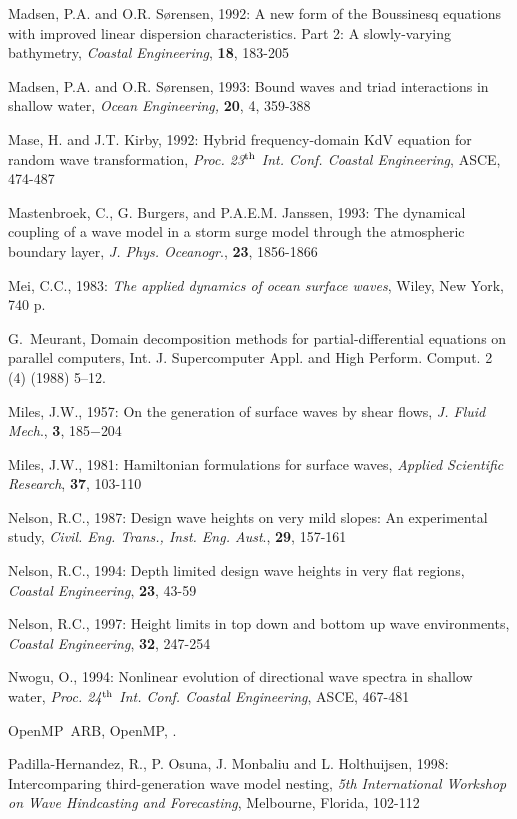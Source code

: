\documentclass[12pt]{book}
\newcommand{\hl}[1]{\htmladdnormallink{{\it #1}}{#1}}
\begin{document}
\begin{thebibliography}{10}
Madsen, P.A. and O.R. S{\o}rensen, 1992: A new form of the Boussinesq equations with improved linear
dispersion characteristics. Part 2: A slowly-varying bathymetry, {\it Coastal Engineering}, {\bf 18}, 183-205

Madsen, P.A. and O.R. S{\o}rensen, 1993: Bound waves and triad interactions in shallow water, {\it Ocean
Engineering,} {\bf 20}, 4, 359-388

Mase, H. and J.T. Kirby, 1992: Hybrid frequency-domain KdV equation for random wave transformation,
{\it Proc. 23$^{{\rm th}}$ Int. Conf. Coastal Engineering}, ASCE, 474-487

Mastenbroek, C., G. Burgers, and P.A.E.M. Janssen, 1993: The dynamical coupling of a wave model in
a storm surge model through the atmospheric boundary layer, {\it J. Phys. Oceanogr}., {\bf 23}, 1856-1866

Mei, C.C., 1983: {\it The applied dynamics of ocean surface waves}, Wiley, New York, 740 p.

G.~Meurant, Domain decomposition methods for partial-differential equations on
  parallel computers, Int. J. Supercomputer Appl. and High Perform. Comput. 2
  (4) (1988) 5--12.

Miles, J.W., 1957: On the generation of surface waves by shear flows, {\it J. Fluid Mech}., {\bf 3}, 185$-$204

Miles, J.W., 1981: Hamiltonian formulations for surface waves, {\it Applied Scientific Research}, {\bf 37}, 103-110

Nelson, R.C., 1987: Design wave heights on very mild slopes: An experimental study, {\it Civil. Eng. Trans.,
Inst. Eng. Aust}., {\bf 29}, 157-161

Nelson, R.C., 1994: Depth limited design wave heights in very flat regions, {\it Coastal Engineering}, {\bf 23}, 43-59

Nelson, R.C., 1997: Height limits in top down and bottom up wave environments, {\it Coastal Engineering},
{\bf 32}, 247-254

Nwogu, O., 1994: Nonlinear evolution of directional wave spectra in shallow water, {\it Proc. 24$^{{\rm th}}$ Int. Conf.
Coastal Engineering}, ASCE, 467-481

OpenMP~ARB, {OpenMP}, \hl{http://www.openmp.org}.

Padilla-Hernandez, R., P. Osuna, J. Monbaliu and L. Holthuijsen, 1998: Intercomparing third-generation
wave model nesting, {\it 5th International Workshop on Wave Hindcasting and Forecasting}, Melbourne, Florida, 102-112


\end{thebibliography}
\end{document}
